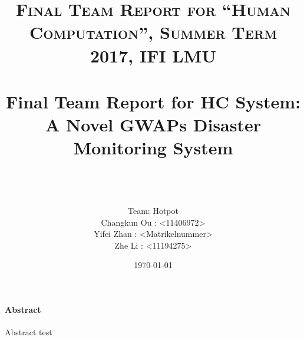 \documentclass[paper=a4, fontsize=11pt]{scrartcl}
\title{	
\normalfont \normalsize 
\textsc{Final Team Report for ``Human Computation'', Summer Term 2017, IFI LMU} \\ [25pt]
\horrule{0.5pt} \\[0.4cm]
\huge Final Team Report for HC System: \\
A Novel GWAPs Disaster Monitoring System\\
\horrule{2pt} \\[0.5cm] %
}
\author{
  \\ Team: Hotpot\\
  Changkun Ou : <11406972> \\
  Yifei Zhan : <Matrikelnummer> \\
  Zhe Li : <11194275>  }
\date{\today}
\numberwithin{equation}{section}
\numberwithin{figure}{section}
\numberwithin{table}{section}
\begin{document}
\maketitle

\tableofcontents

\paragraph{Abstract}

Abstract test








\nocite{*}


\end{document}
